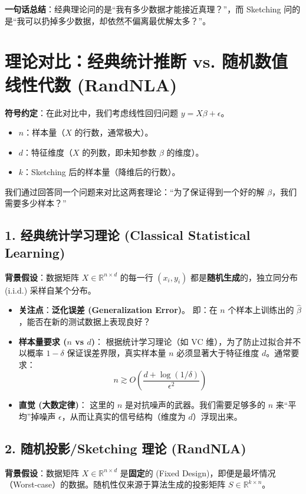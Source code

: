 \documentclass[11pt,a4paper]{ctexart}
\theoremstyle{definition}
\theoremstyle{remark}
\begin{document}
\textbf{一句话总结}：经典理论问的是“我有多少数据才能接近真理？”，而 Sketching 问的是“我可以扔掉多少数据，却依然不偏离最优解太多？”。


\section{理论对比：经典统计推断 vs. 随机数值线性代数 (RandNLA)}

\textbf{符号约定}：在此对比中，我们考虑线性回归问题 $y = X\beta + \epsilon$。
\begin{itemize}
    \item $n$：样本量（$X$ 的行数，通常极大）。
    \item $d$：特征维度（$X$ 的列数，即未知参数 $\beta$ 的维度）。
    \item $k$：Sketching 后的样本量（降维后的行数）。
\end{itemize}

我们通过回答同一个问题来对比这两套理论：“为了保证得到一个好的解 $\beta$，我们需要多少样本？”

\subsection{1. 经典统计学习理论 (Classical Statistical Learning)}
\textbf{背景假设}：数据矩阵 $X \in \mathbb{R}^{n \times d}$ 的每一行 $(x_i, y_i)$ 都是\textbf{随机生成}的，独立同分布 (i.i.d.) 采样自某个分布。

\begin{itemize}
    \item \textbf{关注点}：\textbf{泛化误差 (Generalization Error)}。
    即：在 $n$ 个样本上训练出的 $\hat{\beta}$，能否在新的测试数据上表现良好？
    
    \item \textbf{样本量要求 ($n$ vs $d$)}：
    根据统计学习理论（如 VC 维），为了防止过拟合并不以概率 $1-\delta$ 保证误差界限，真实样本量 $n$ 必须显著大于特征维度 $d$。通常要求：
    \[
    n \gtrsim O\left(\frac{d + \log(1/\delta)}{\epsilon^2}\right)
    \]
    
    \item \textbf{直觉 (大数定律)}：
    这里的 $n$ 是对抗噪声的武器。我们需要足够多的 $n$ 来“平均”掉噪声 $\epsilon$，从而让真实的信号结构（维度为 $d$）浮现出来。
\end{itemize}

\subsection{2. 随机投影/Sketching 理论 (RandNLA)}
\textbf{背景假设}：数据矩阵 $X \in \mathbb{R}^{n \times d}$ 是\textbf{固定}的 (Fixed Design)，即便是最坏情况（Worst-case）的数据。随机性仅来源于算法生成的投影矩阵 $S \in \mathbb{R}^{k \times n}$。
\end{document}
